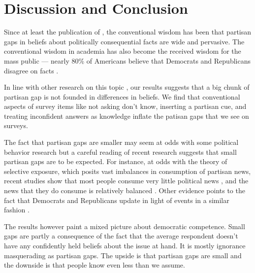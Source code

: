 \documentclass[12pt, letterpaper]{article}
\begin{document}
\section*{Discussion and Conclusion}

Since at least the publication of \cite{bartels_2002}, the conventional wisdom has been that partisan gaps in beliefs about politically consequential facts are wide and pervasive. 
The conventional wisdom in academia has also become the received wisdom for the mass public --- nearly 80\% of Americans believe that Democrats and Republicans  disagree on facts \citep{pew2018disagree}.

In line with other research on this topic \citep[][though see \citeauthor{berinsky_2017} \citeyear{berinsky_2017} and \citeauthor{peterson_iyengar_forth} \citeyear{peterson_iyengar_forth}]{bullocketal_2015, prior2015you, schaffner_luks}, our results suggests that a big chunk of partisan gap is not founded in differences in beliefs. We find that conventional aspects of survey items like not asking don't know, inserting a partisan cue, and treating inconfident answers as knowledge inflate the patisan gaps that we see on surveys.

The fact that partisan gaps are smaller may seem at odds with some political behavior research but a careful reading of recent research suggests that small partisan gaps are to be expected. For instance, at odds with the theory of selective exposure, which posits vast imbalances in consumption of partisan news, recent studies show that most people consume very little political news \citep{Prior2007,flaxmanetal_2016}, and the news that they do consume is relatively balanced \citep{flaxmanetal_2016,garzetal_2018,gentzkowshapiro_2011,guess_2020}. Other evidence points to the fact that Democrats and Republicans update in light of events in a similar fashion \citep{gerber_annual_review,kernell_2019}.

The results however paint a mixed picture about democratic competence. Small gaps are partly a consequence of the fact that the average respondent doesn't have any confidently held beliefs about the issue at hand. It is mostly ignorance masquerading as partisan gaps. The upside is that partisan gaps are small and the downside is that people know even less than we assume.

\clearpage



\clearpage


\end{document}
